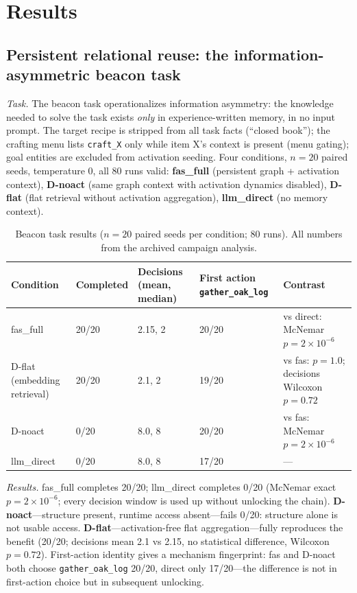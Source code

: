 \documentclass[10pt,a4paper]{article}
\begin{document}
\section{Results}
\label{sec:results}

\subsection{Persistent relational reuse: the information-asymmetric beacon task}
\label{sec:res-reuse}

\emph{Task.} The beacon task operationalizes information asymmetry: the knowledge needed to solve the task exists \emph{only} in experience-written memory, in no input prompt. The target recipe is stripped from all task facts (``closed book''); the crafting menu lists \texttt{craft\_X} only while item X's context is present (menu gating); goal entities are excluded from activation seeding. Four conditions, $n{=}20$ paired seeds, temperature 0, all 80 runs valid: \textbf{fas\_full} (persistent graph + activation context), \textbf{D-noact} (same graph context with activation dynamics disabled), \textbf{D-flat} (flat retrieval without activation aggregation), \textbf{llm\_direct} (no memory context).

\begin{table}[t]
\centering\small
\caption{Beacon task results ($n{=}20$ paired seeds per condition; 80 runs). All numbers from the archived campaign analysis.}
\label{tab:beacon}
\begin{tabular}{L{2.6cm}L{2.2cm}L{3.4cm}L{3.4cm}L{2.6cm}}
\toprule
\textbf{Condition} & \textbf{Completed} & \textbf{Decisions (mean, median)} & \textbf{First action \texttt{gather\_oak\_log}} & \textbf{Contrast} \\
\midrule
fas\_full & 20/20 & 2.15, 2 & 20/20 & vs direct: McNemar $p{=}2\times10^{-6}$ \\
D-flat (embedding retrieval) & 20/20 & 2.1, 2 & 19/20 & vs fas: $p{=}1.0$; decisions Wilcoxon $p{=}0.72$ \\
D-noact & 0/20 & 8.0, 8 & 20/20 & vs fas: McNemar $p{=}2\times10^{-6}$ \\
llm\_direct & 0/20 & 8.0, 8 & 17/20 & --- \\
\bottomrule
\end{tabular}
\end{table}

\emph{Results.} fas\_full completes 20/20; llm\_direct completes 0/20 (McNemar exact $p{=}2\times10^{-6}$; every decision window is used up without unlocking the chain). \textbf{D-noact}---structure present, runtime access absent---fails 0/20: structure alone is not usable access. \textbf{D-flat}---activation-free flat aggregation---fully reproduces the benefit (20/20; decisions mean 2.1 vs 2.15, no statistical difference, Wilcoxon $p{=}0.72$). First-action identity gives a mechanism fingerprint: fas and D-noact both choose \texttt{gather\_oak\_log} 20/20, direct only 17/20---the difference is not in first-action choice but in subsequent unlocking.
\end{document}
